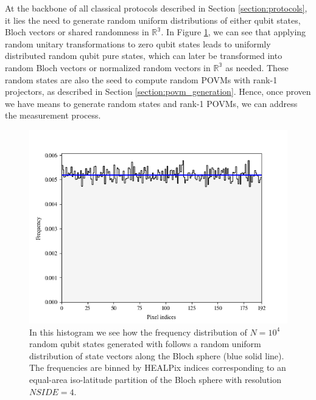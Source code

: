 At the backbone of all classical protocols described in Section \ref{section:protocols}, it lies the need to generate random uniform distributions of either qubit states, Bloch vectors or shared randomness in $\mathbb{R^3}$. In Figure \ref{fig:results_random_states}, we can see that applying random unitary transformations to zero qubit states leads to uniformly distributed random qubit pure states, which can later be transformed into random Bloch vectors or normalized random vectors in $\mathbb{R^3}$ as needed. These random states are also the seed to compute random POVMs with rank-1 projectors, as described in Section \ref{section:povm_generation}. Hence, once proven we have means to generate random states and rank-1 POVMs, we can address the measurement process. 
\begin{figure}[h]
\centering
\includegraphics[width=\textwidth]{images/random_bloch_healpix.png}
\caption{In this histogram we see how the frequency distribution of $N=10^4$ random qubit states generated with \cite{software2023} follows a random uniform distribution of state vectors along the Bloch sphere (blue solid line). The frequencies are binned by HEALPix indices corresponding to an equal-area iso-latitude partition of the Bloch sphere with resolution $\mathit{NSIDE}=4$.}
\label{fig:results_random_states}
\end{figure}

